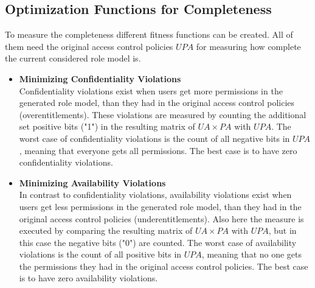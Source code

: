         \subsection{Optimization Functions for Completeness}
        \label{sec:optimizationCompleteness}
        To measure the completeness different fitness functions can be created. All of them need the original access control policies $UPA$ for measuring how complete the current considered role model is.
        \begin{itemize}
            \item \textbf{Minimizing Confidentiality Violations}\\
            Confidentiality violations exist when users get more permissions in the generated role model, than they had in the original access control policies (overentitlements). These violations are measured by counting the additional set positive bits ("1") in the resulting matrix of $UA \times PA$ with $UPA$. The worst case of confidentiality violations is the count of all negative bits in $UPA$, meaning that everyone gets all permissions. The best case is to have zero confidentiality violations.
            \item \textbf{Minimizing Availability Violations}\\
            In contrast to confidentiality violations, availability violations exist when users get less permissions in the generated role model, than they had in the original access control policies (underentitlements). Also here the measure is executed by comparing the resulting matrix of $UA \times PA$ with $UPA$, but in this case the negative bits ("0") are counted. The worst case of availability violations is the count of all positive bits in $UPA$, meaning that no one gets the permissions they had in the original access control policies. The best case is to have zero availability violations.

\end{itemize}
